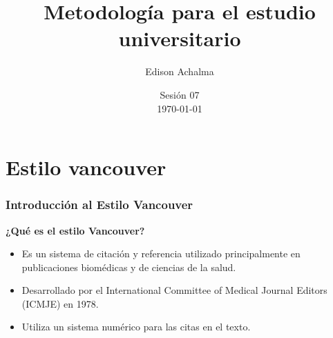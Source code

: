 \documentclass[
11pt, %
]{beamer}
\title[Metodología de Investigación]{Metodología para el estudio universitario} %
\author[Edison Achalma]{Edison Achalma} %
\institute[CAU - UNSCH]{Corporación Académica Universitaria CAU - UNSCH \\ \smallskip \textit{achalmed.18@gmail.com}} %
\date[\today]{Sesión 07 \\ \today} %
\begin{document}
\begin{frame}
	\titlepage
\end{frame}





\section{Estilo vancouver}
\begin{frame}
	\frametitle{Introducción al Estilo Vancouver}

	\textbf{¿Qué es el estilo Vancouver?}
	\begin{itemize}
		\item Es un sistema de citación y referencia utilizado principalmente en publicaciones biomédicas y de ciencias de la salud.
		\item Desarrollado por el International Committee of Medical Journal Editors (ICMJE) en 1978.
		\item Utiliza un sistema numérico para las citas en el texto.
	\end{itemize}

\end{frame}
\end{document}
